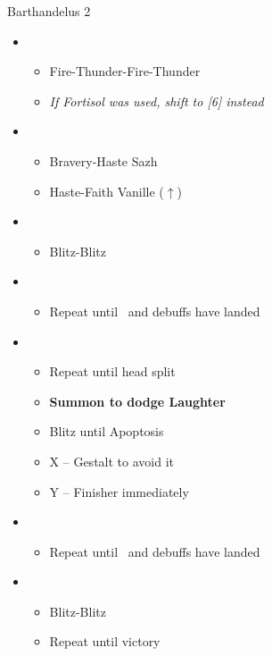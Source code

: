 \begin{battle}{Barthandelus 2}
	\begin{itemize}
		\item \fifth
			\begin{itemize}
				\item Fire-Thunder-Fire-Thunder
				\item \textit{If Fortisol was used, shift to [6] instead}
			\end{itemize}
		\item \first
			\begin{itemize}
				\item Bravery-Haste Sazh
				\item Haste-Faith Vanille ($\uparrow$)
			\end{itemize}	
		\item \sixth
			\begin{itemize}
				\item Blitz-Blitz
			\end{itemize}	
		\item \fifth
			\begin{itemize}
				\item Repeat until \stagger~and debuffs have landed
			\end{itemize}	
		\item \second
			\begin{itemize}
				\item Repeat until head split
				\item \textbf{Summon to dodge Laughter}
				\item Blitz until Apoptosis
				\item X -- Gestalt to avoid it
				\item Y -- Finisher immediately
			\end{itemize}	
		\item \fifth
			\begin{itemize}
				\item Repeat until \stagger~and debuffs have landed
			\end{itemize}	
		\item \sixth
			\begin{itemize}
				\item Blitz-Blitz
				\item Repeat until victory
			\end{itemize}																
	\end{itemize}
\end{battle}
\vfill
\ 
\columnbreak